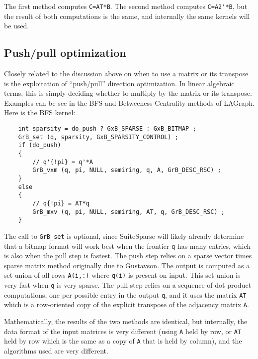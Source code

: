 \documentclass[12pt]{article}
\begin{document}
The first method computes \verb'C=AT*B'.  The second method computes
\verb"C=A2'*B", but the result of both computations is the same, and internally
the same kernels will be used.

\subsection{Push/pull optimization}

Closely related to the discussion above on when to use a matrix or its
transpose is the exploitation of ``push/pull'' direction optimization.  In
linear algebraic terms, this is simply deciding whether to multiply by the
matrix or its transpose.  Examples can be see in the BFS and
Betweeness-Centrality methods of LAGraph.  Here is the BFS kernel:

    {\footnotesize
    \begin{verbatim}
    int sparsity = do_push ? GxB_SPARSE : GxB_BITMAP ;
    GrB_set (q, sparsity, GxB_SPARSITY_CONTROL) ;
    if (do_push)
    {
        // q'{!pi} = q'*A
        GrB_vxm (q, pi, NULL, semiring, q, A, GrB_DESC_RSC) ;
    }
    else
    {
        // q{!pi} = AT*q
        GrB_mxv (q, pi, NULL, semiring, AT, q, GrB_DESC_RSC) ;
    }\end{verbatim}}

The call to \verb'GrB_set' is optional, since SuiteSparse will likely already
determine that a bitmap format will work best when the frontier \verb'q' has
many entries, which is also when the pull step is fastest.  The push step
relies on a sparse vector times sparse matrix method originally due to
Gustavson.  The output is computed as a set union of all rows \verb'A(i,:)'
where \verb'q(i)' is present on input.  This set union is very fast when
\verb'q' is very sparse.  The pull step relies on a sequence of dot product
computations, one per possible entry in the output \verb'q', and it uses the
matrix \verb"AT" which is a row-oriented copy of the explicit transpose of the
adjacency matrix \verb'A'.

Mathematically, the results of the two methods are identical, but internally,
the data format of the input matrices is very different (using \verb'A' held
by row, or \verb'AT' held by row which is the same as a copy of \verb'A' that
is held by column), and the algorithms used are very different.
\end{document}

